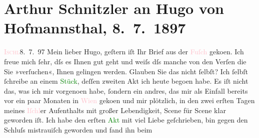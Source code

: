 

               \section[Arthur Schnitzler an Hugo von Hofmannsthal, 8. 7. 1897]{ Arthur Schnitzler an Hugo von Hofmannsthal,
                    8. 7. 1897}\nopagebreak{}\rehead{ }\normalsize\beginnumbering{} \toendnotes[C]{\smallbreak\pagebreak[2]} 
\toendnotes[C]{\smallbreak}\pstart
           {\pb}\textcolor{pink}{\textsc{Ischl}}{}\ledrightnote{\textcolor{pink}{Bad Ischl}}{ }8. 7. 97\pend
           \pstart
           Mein lieber Hugo, geſtern iſt Ihr Brief aus der \textcolor{pink}{Fuſch}{}\ledrightnote{\textcolor{pink}{Bad Fusch}} geko{\geminationm}en. Ich freue mich
                    ſehr, dſs es Ihnen gut geht und weiſs dſs manche von den Verſen die Sie
                    »verſuchen«, Ihnen gelingen werden. Glauben Sie das nicht ſelbſt? Ich ſelbſt
                    ſchreibe an einem \textcolor{green}{Stück}{},
                    deſſen zweiten Akt ich heute bego{\geminationn}en habe. Es iſt
                    nicht das, was ich mir vorgeno{\geminationm}en habe, ſondern ein
                    andres, das mir als Einfall bereits vor ein paar Monaten in \textcolor{pink}{Wien}{}\ledrightnote{\textcolor{pink}{Wien}} geko{\geminationm}en und mir
                    plötzlich, in den zwei erſten Tagen meines \textcolor{pink}{Iſchl}{}\ledrightnote{\textcolor{pink}{Bad Ischl}}er {\pb}Aufenthalts mit großer
                    Lebendigkeit, Scene für Scene klar geworden iſt. Ich habe den erſten \textcolor{green}{Akt}{} mit viel Liebe
                    geſchrieben, bin gegen den Schluſs mistrauiſch geworden und fand ihn beim
